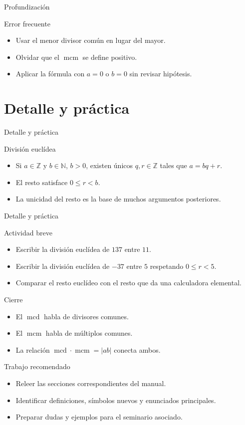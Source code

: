 \documentclass[aspectratio=169,11pt]{beamer}
\newcommand{\mcd}{\operatorname{mcd}}
\newcommand{\mcm}{\operatorname{mcm}}
\begin{document}
\begin{frame}{Profundización}
\begin{block}{Error frecuente}
\begin{itemize}
  \item Usar el menor divisor común en lugar del mayor.
  \item Olvidar que el \(\mcm\) se define positivo.
  \item Aplicar la fórmula con \(a=0\) o \(b=0\) sin revisar hipótesis.
\end{itemize}
\end{block}
\end{frame}


\section{Detalle y práctica}

\begin{frame}{Detalle y práctica}
\begin{block}{División euclídea}
\begin{itemize}
  \item Si \(a\in\mathbb{Z}\) y \(b\in\mathbb{N}\), \(b>0\), existen únicos \(q,r\in\mathbb{Z}\) tales que \(a=bq+r\).
  \item El resto satisface \(0\leq r<b\).
  \item La unicidad del resto es la base de muchos argumentos posteriores.
\end{itemize}
\end{block}
\end{frame}

\begin{frame}{Detalle y práctica}
\begin{block}{Actividad breve}
\begin{itemize}
  \item Escribir la división euclídea de \(137\) entre \(11\).
  \item Escribir la división euclídea de \(-37\) entre \(5\) respetando \(0\leq r<5\).
  \item Comparar el resto euclídeo con el resto que da una calculadora elemental.
\end{itemize}
\end{block}
\end{frame}

\begin{frame}{Cierre}
\begin{itemize}
  \item El \(\mcd\) habla de divisores comunes.
  \item El \(\mcm\) habla de múltiplos comunes.
  \item La relación \(\mcd\cdot\mcm=|ab|\) conecta ambos.
\end{itemize}
\end{frame}

\begin{frame}{Trabajo recomendado}
\begin{itemize}
  \item Releer las secciones correspondientes del manual.
  \item Identificar definiciones, símbolos nuevos y enunciados principales.
  \item Preparar dudas y ejemplos para el seminario asociado.
\end{itemize}
\end{frame}
\end{document}

